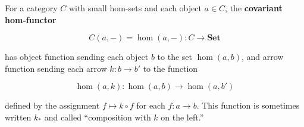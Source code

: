 For a category $C$ with small hom-sets and each object $a \in C$, the \textbf{covariant hom-functor}

$$
C(a, -) = \hom(a, -): C \to \mathbf{Set}
$$

has object function sending each object $b$ to the set $\hom(a, b)$, and arrow function sending each arrow $k: b \to b'$ to the function

$$
\hom(a, k): \hom(a, b) \to \hom(a, b')
$$

defined by the assignment $f \mapsto k \circ f$ for each $f: a \to b$. This function is sometimes written $k_*$ and called ``composition with $k$ on the left.''
